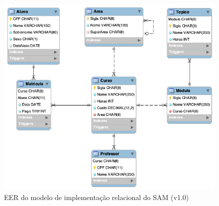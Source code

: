 \documentclass{article}
\begin{document}
\begin{figure}[!htb]
\begin{center}
\includegraphics[scale=.6]{images/SAM-EER.png}
\end{center}
\caption{EER do modelo de implementa\c{c}\~ao relacional do SAM (v1.0)}
\label{fig:eer2}
\end{figure}


\clearpage
%
\end{document}
